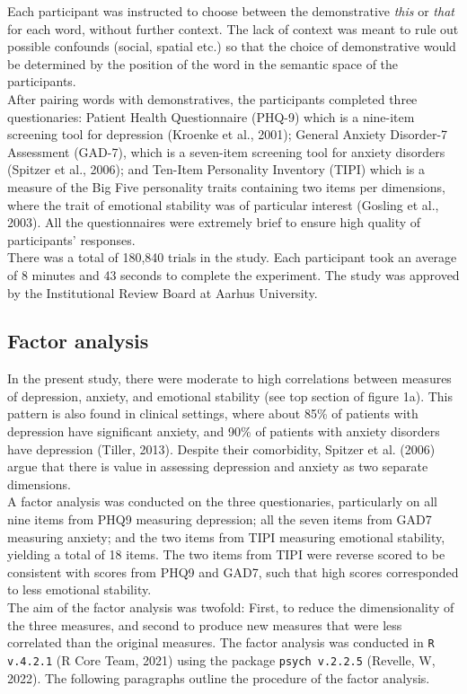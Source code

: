 \documentclass[11pt, a4paper]{article}
\begin{document}
Each participant was instructed to choose between the demonstrative \textit{this} or \textit{that} for each word, without further context. The lack of context was meant to rule out possible confounds (social, spatial etc.) so that the choice of demonstrative would be determined by the position of the word in the semantic space of the participants. \\
After pairing words with demonstratives, the participants completed three questionaries: Patient Health Questionnaire (PHQ-9) which is a nine-item screening tool for depression (Kroenke et al., 2001); General Anxiety Disorder-7 Assessment (GAD-7), which is a seven-item screening tool for anxiety disorders (Spitzer et al., 2006); and Ten-Item Personality Inventory (TIPI) which is a measure of the Big Five personality traits containing two items per dimensions, where the trait of emotional stability was of particular interest (Gosling et al., 2003). All the questionnaires were extremely brief to ensure high quality of participants’ responses. \\

There was a total of 180,840 trials in the study. Each participant took an average of 8 minutes and 43 seconds to complete the experiment. The study was approved by the Institutional Review Board at Aarhus University.  


\subsection{Factor analysis}
In the present study, there were moderate to high correlations between measures of depression, anxiety, and emotional stability (see top section of figure 1a). This pattern is also found in clinical settings, where about 85\% of patients with depression have significant anxiety, and 90\% of patients with anxiety disorders have depression (Tiller, 2013). Despite their comorbidity, Spitzer et al. (2006) argue that there is value in assessing depression and anxiety as two separate dimensions.\\

A factor analysis was conducted on the three questionaries, particularly on all nine items from PHQ9 measuring depression; all the seven items from GAD7 measuring anxiety; and the two items from TIPI measuring emotional stability, yielding a total of 18 items. The two items from TIPI were reverse scored to be consistent with scores from PHQ9 and GAD7, such that high scores corresponded to less emotional stability. \\
The aim of the factor analysis was twofold: First, to reduce the dimensionality of the three measures, and second to produce new measures that were less correlated than the original measures. The factor analysis was conducted in \texttt{R v.4.2.1} (R Core Team, 2021) using the package \texttt{psych v.2.2.5} (Revelle, W, 2022). The following paragraphs outline the procedure of the factor analysis. \\
\end{document}
